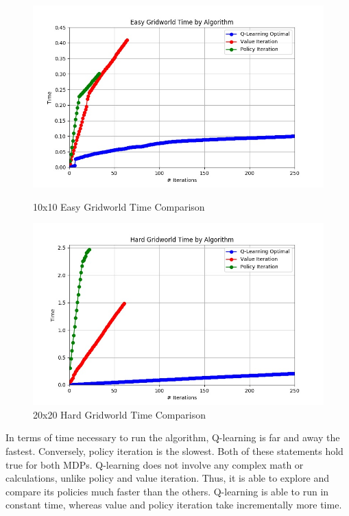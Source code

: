 \documentclass[h]{article}
\begin{document}
  \begin{figure}[H]
   \endminipage\hfill
      \includegraphics[width=1\textwidth,keepaspectratio]{easy_time.jpg} 
      \caption*{10x10 Easy Gridworld Time Comparison} 
   \endminipage\hfill
      \includegraphics[width=1\textwidth,keepaspectratio]{hard_time.jpg} 
      \caption*{20x20 Hard Gridworld Time Comparison} 
   \endminipage\hfill
   \endminipage\hfill
\end{figure}
In terms of time necessary to run the algorithm, Q-learning is far and away the 
fastest.  Conversely, policy iteration is the slowest.  Both of these statements 
hold true for both MDPs.  Q-learning does not involve any complex math or 
calculations, unlike policy and value iteration.  Thus, it is able to explore 
and compare its policies much faster than the others.  Q-learning is able to run 
in constant time, whereas value and policy iteration take incrementally more 
time.
\end{document}
